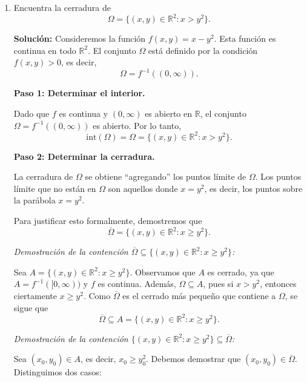 \documentclass[12pt]{article}
\newcommand{\Int}{\mathrm{int}}
\newcommand{\R}{\mathbb R}
\newcommand{\y}{\mathrm y}
\begin{document}
\begin{enumerate}
Ahora, expresamos $\mathbf{w}$ como
\[
\mathbf{w} = \mathbf{u} + \y.
\]
Como $\mathbf{u} \in \Omega$ y $\y \in \Delta$, se sigue que $\mathbf{w} \in \Omega + \Delta$.

Por lo tanto, $B(\mathbf{z}, \varepsilon) \subseteq \Omega + \Delta$.

Como $\mathbf{z} \in \Omega + \Delta$ era arbitrario, hemos demostrado que todo punto de $\Omega + \Delta$ tiene una bola abierta centrada en él completamente contenida en $\Omega + \Delta$. Por lo tanto,
\[
\Omega + \Delta \text{ es abierto.}
\]

\item Encuentra la cerradura de 
\[ \Omega = \{ (x,y)\in \R^2 : x > y^2 \}. \]

\textbf{Solución: }
Consideremos la función $f(x,y) = x - y^2$. Esta función es continua en todo $\R^2$. El conjunto $\Omega$ está definido por la condición $f(x,y) > 0$, es decir,
\[
\Omega = f^{-1}((0, \infty)).
\]

\textbf{Paso 1: Determinar el interior.}

Dado que $f$ es continua y $(0, \infty)$ es abierto en $\R$, el conjunto $\Omega = f^{-1}((0, \infty))$ es abierto. Por lo tanto,
\[
\Int(\Omega) = \Omega = \{ (x,y)\in \R^2 : x > y^2 \}.
\]

\textbf{Paso 2: Determinar la cerradura.}

La cerradura de $\Omega$ se obtiene ``agregando'' los puntos límite de $\Omega$. Los puntos límite que no están en $\Omega$ son aquellos donde $x = y^2$, es decir, los puntos sobre la parábola $x = y^2$.

Para justificar esto formalmente, demostremos que
\[
\overline{\Omega} = \{ (x,y)\in \R^2 : x \geq y^2 \}.
\]

\textit{Demostración de la contención $\overline{\Omega} \subseteq \{ (x,y)\in \R^2 : x \geq y^2 \}$:}

Sea $A = \{ (x,y)\in \R^2 : x \geq y^2 \}$. Observamos que $A$ es cerrado, ya que $A = f^{-1}([0, \infty))$ y $f$ es continua. Además, $\Omega \subseteq A$, pues si $x > y^2$, entonces ciertamente $x \geq y^2$. Como $\overline{\Omega}$ es el cerrado más pequeño que contiene a $\Omega$, se sigue que
\[
\overline{\Omega} \subseteq A = \{ (x,y)\in \R^2 : x \geq y^2 \}.
\]

\textit{Demostración de la contención $\{ (x,y)\in \R^2 : x \geq y^2 \} \subseteq \overline{\Omega}$:}

Sea $(x_0, y_0) \in A$, es decir, $x_0 \geq y_0^2$. Debemos demostrar que $(x_0, y_0) \in \overline{\Omega}$. Distinguimos dos casos:


\end{enumerate}
\end{document}
